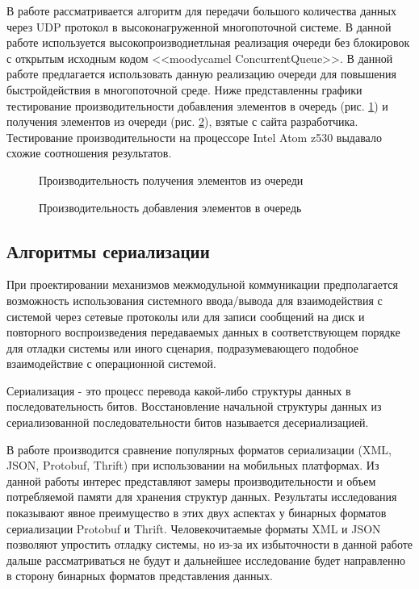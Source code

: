 В работе \cite{syzovalgorithm} рассматривается алгоритм для передачи большого количества данных через UDP протокол в высоконагруженной многопоточной системе. В данной работе используется высокопроизводиетльная реализация очереди без блокировок с открытым исходным кодом <<moodycamel ConcurrentQueue>>. В данной работе предлагается использовать данную реализацию очереди для повышения быстройдействия в многопоточной среде. Ниже представленны графики тестирование производительности добавления элементов в очередь (рис. \ref{im:2_1_2_dequeue}) и получения элементов из очереди (рис. \ref{im:2_1_3_enqueue}), взятые с сайта разработчика. Тестирование производительности на процессоре Intel Atom z530 выдавало схожие соотношения результатов.

\begin{figure}[h]
    \caption{Производительность получения элементов из очереди}
    \label{im:2_1_2_dequeue}
\end{figure}

\begin{figure}[h]
    \caption{Производительность добавления элементов в очередь}
    \label{im:2_1_3_enqueue}
\end{figure}

\subsection{Алгоритмы сериализации}

При проектировании механизмов межмодульной коммуникации предполагается возможность использования системного ввода/вывода для взаимодействия с системой через сетевые протоколы или для записи сообщений на диск и повторного воспроизведения передаваемых данных в соответствующем порядке для отладки системы или иного сценария, подразумевающего подобное взаимодействие с операционной системой.

Сериализация - это процесс перевода какой-либо структуры данных в последовательность битов. Восстановление начальной структуры данных из сериализованной последовательности битов называется десериализацией.

В работе \cite{sumaray2012comparison} производится сравнение популярных форматов сериализации (XML, JSON, Protobuf, Thrift) при использовании на мобильных платформах. Из данной работы интерес представляют замеры производительности и объем потребляемой памяти для хранения структур данных. Результаты исследования показывают явное преимущество в этих двух аспектах у бинарных форматов сериализации Protobuf и Thrift. Человекочитаемые форматы XML и JSON позволяют упростить отладку системы, но из-за их избыточности в данной работе дальше рассматриваться не будут и дальнейшее исследование будет направленно в сторону бинарных форматов представления данных.

